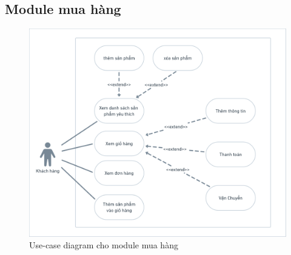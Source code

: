 \newpage
\subsection{Module mua hàng}
\begin{figure}[h]
    \centering
    \includegraphics[scale = 0.2]{img/mod/mh-mod.png}
    \vspace{1cm}
    \caption{Use-case diagram cho module mua hàng}
    \label{fig:taskAssignment}
\end{figure}


